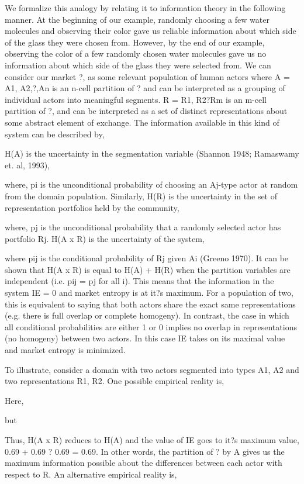 We formalize this analogy by relating it to information theory in the following manner. At the beginning of our example, randomly choosing a few water molecules and observing their color gave us reliable information about which side of the glass they were chosen from. However, by the end of our example, observing the color of a few randomly chosen water molecules gave us no information about which side of the glass they were selected from.     
We can consider our market ?, as some relevant population of human actors where {A} = {A1, A2,?,An} is an n-cell partition of ? and can be interpreted as a grouping of individual actors into meaningful segments. {R} = {R1, R2?Rm} is an m-cell partition of ?, and can be interpreted as a set of distinct representations about some abstract element of exchange.  The information available in this kind of system can be described by,

H(A) is the uncertainty in the segmentation variable (Shannon 1948; Ramaswamy et. al, 1993), 

where, pi is the unconditional probability of choosing an Aj-type actor at random from the domain population. Similarly, H(R) is the uncertainty in the set of representation portfolios held by the community,

where, pj is the unconditional probability that a randomly selected actor has portfolio Rj. H(A x R) is the uncertainty of the system,

where pij is the conditional probability of Rj given Ai (Greeno 1970). It can be shown that H(A x R) is equal to H(A) + H(R) when the partition variables are independent (i.e. pij = pj for all i). This means that the information in the system IE = 0 and market entropy is at it?s maximum. For a population of two, this is equivalent to saying that both actors share the exact same representations (e.g. there is full overlap or complete homogeny). In contrast, the case in which all conditional probabilities are either 1 or 0 implies no overlap in representations (no homogeny) between two actors. In this case IE takes on its maximal value and market entropy is minimized.
 
To illustrate, consider a domain with two actors segmented into types {A1, A2} and two representations {R1, R2}.  One possible empirical reality is,
	
Here, 

but

Thus, H(A x R) reduces to H(A) and the value of IE goes to it?s maximum value,
0.69 + 0.69 ? 0.69 = 0.69.
In other words, the partition of ? by {A} gives us the maximum information possible about the differences between each actor with respect to R. An alternative empirical reality is, 

